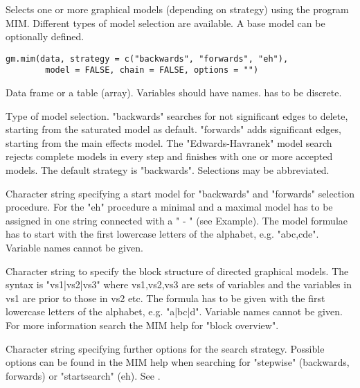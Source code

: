 \begin{Description}\relax
Selects one or more graphical models (depending on strategy) using the program MIM.
Different types of model selection are available. A base model can be optionally defined.
\end{Description}
\begin{Usage}
\begin{verbatim}
gm.mim(data, strategy = c("backwards", "forwards", "eh"),
        model = FALSE, chain = FALSE, options = "")
\end{verbatim}
\end{Usage}
\begin{Arguments}
\begin{ldescription}
\item[\code{data}] Data frame or a table (array). Variables should have names.  has to be discrete. 
\item[\code{strategy}] Type of model selection. "backwards" searches for not significant edges to delete, starting from the saturated model as default.
"forwards" adds significant edges, starting from the main effects model. The "Edwards-Havranek"
model search rejects complete models in every step and finishes with one or more accepted models.
The default strategy is "backwards". Selections may be abbreviated.

\item[\code{model}] Character string specifying a start model for "backwards" and "forwards" selection procedure.
For the "eh" procedure a minimal and a maximal model has to be assigned in one string
connected with a " - " (see Example). The model formulae has to start with the first lowercase letters of the alphabet, e.g. "abc,cde".
Variable names cannot be given.

\item[\code{chain}] Character string to specify the block structure of directed graphical models.
The syntax is "vs1|vs2|vs3" where vs1,vs2,vs3 are sets of variables and the variables in vs1 are prior to those in vs2 etc.
The formula has to be given with the first lowercase letters of the alphabet, e.g. "a|bc|d". Variable names cannot be given.
For more information search the MIM help for "block overview".

\item[\code{options}] Character string specifying further options for the search strategy. Possible options can be found in the MIM help when searching for
"stepwise" (backwards, forwards) or "startsearch" (eh).  See .

\end{ldescription}
\end{Arguments}
